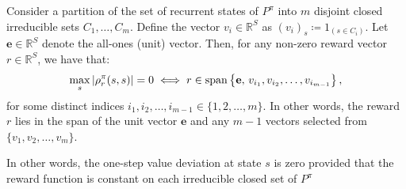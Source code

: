 \begin{tcolorbox}
    
\begin{proposition}
Consider a partition  of the set of recurrent states of $P^\pi$ into $m$ disjoint closed irreducible sets $C_1,\dots, C_m$. Define the vector $v_i\in \mathbb{R}^S$  as $(v_i)_s \coloneqq  1_{(s\in C_i)}$. Let $\mathbf{e} \in \mathbb{R}^S $ denote the all-ones (unit) vector. Then, for any non-zero reward vector $ r \in \mathbb{R}^S $, we have that:
    \[
        \max_s |\rho_r^\pi(s,s)| = 0 \iff r \in {\rm span}\left\{ \mathbf{e}, \, v_{i_1}, v_{i_2}, \dots, v_{i_{m-1}} \right\},
    \]
    for some distinct indices $ i_1, i_2, \dots, i_{m-1} \in \{1, 2, \dots, m\} $. In other words, the reward  $ r $ lies in the span of the unit vector $\mathbf{e}$ and any $m-1$ vectors selected from $ \{v_1, v_2, \dots, v_m\}$.
\end{proposition}
\end{tcolorbox}
In other words, the one-step value deviation at state $s$ is zero provided that the reward function is constant on each irreducible closed set of $P^\pi$
